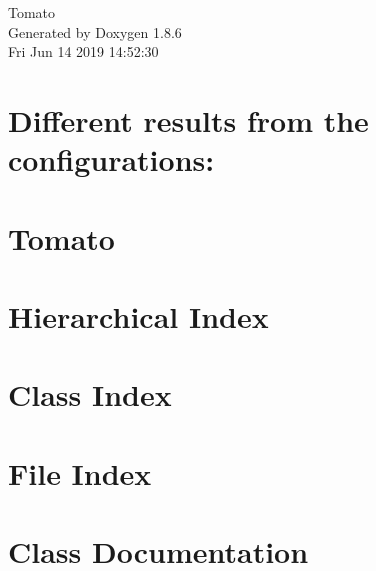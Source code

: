 \documentclass[twoside]{book}
\newcommand{\clearemptydoublepage}{%
  \newpage{\pagestyle{empty}\cleardoublepage}%
}
\begin{document}
\hypersetup{pageanchor=false}
\begin{titlepage}
\vspace*{7cm}
\begin{center}%
{\Large Tomato }\\
\vspace*{1cm}
{\large Generated by Doxygen 1.8.6}\\
\vspace*{0.5cm}
{\small Fri Jun 14 2019 14:52:30}\\
\end{center}
\end{titlepage}
\clearemptydoublepage
\tableofcontents
\clearemptydoublepage
{}
\hypersetup{pageanchor=true}

\chapter{Different results from the configurations\-:}
\label{md_notepad}
\hypertarget{md_notepad}{}

\chapter{Tomato}
\label{md__r_e_a_d_m_e}
\hypertarget{md__r_e_a_d_m_e}{}

\chapter{Hierarchical Index}

\chapter{Class Index}

\chapter{File Index}

\chapter{Class Documentation}
























\end{document}
